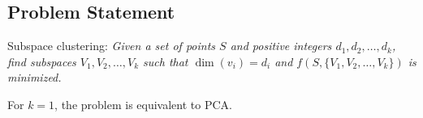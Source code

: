 \documentclass{article}
\begin{document}
\subsection{Problem Statement}

Subspace clustering: \emph{Given a set of points $S$ and positive integers
$d_1, d_2, \dots, d_k$, find subspaces $V_1, V_2, \dots, V_k$ such that
$\dim(v_i) = d_i$ and $f(S, \{V_1, V_2, \dots, V_k\})$ is minimized.}

For $k=1$, the problem is equivalent to PCA.

\begin{lemma}
\end{lemma}
\end{document}
